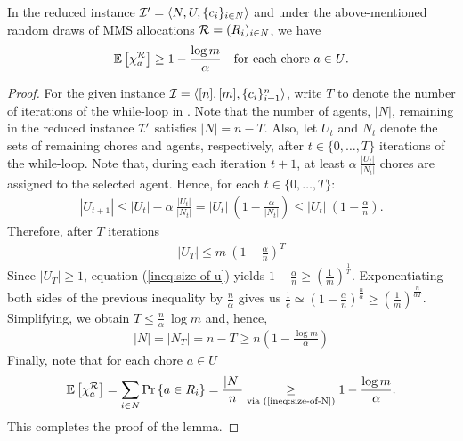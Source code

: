 \begin{lemma}\label{lem:rem-agents}
    In the reduced instance $\mathcal{I}'=\langle N,U,\{c_i\}_{i\in N}\rangle$ and under the above-mentioned random draws of MMS allocations $\mathcal{R}=(R_i)_{i\in N}$, we have  
    \begin{align*}
        \mathbb{E}\left[\chi^{\mathcal{R}}_a\right]\geq 1-\frac{\log m}{\alpha} \quad \text{for each chore $a\in U$.}
    \end{align*}
\end{lemma}
\begin{proof}
    For the given instance $\mathcal{I} = \langle [n], [m], \{c_i\}_{i=1}^n \rangle$, write $T$ to denote the number of iterations of the while-loop in . Note that the number of agents, $|N|$, remaining in the reduced instance $\mathcal{I}'$ satisfies $|N| = n - T$. Also, let $U_t$ and $N_t$ denote the sets of remaining chores and agents, respectively, after $t \in \{0,\dots,T\}$ iterations of the while-loop. Note that, during each iteration $t+1$, at least $\alpha\ \frac{|U_t|}{|N_t|}$ chores are assigned to the selected agent. Hence, for each $t\in\{0,\dots,T\}$: 
    \begin{align*}
    |U_{t+1}| \leq|U_t|-\alpha\ \frac{|U_t|}{|N_t|}=|U_t|\ \left(1-\frac{\alpha}{|N_t|}\right) 
     \leq|U_t|\ \left(1-\frac{\alpha}{n}\right).
    \end{align*} 
    Therefore, after $T$ iterations 
    \begin{align}|U_T| \leq m \  \left( 1 - \frac{\alpha}{n} \right)^T \label{ineq:size-of-u} 
    \end{align}
    Since $|U_T|\geq 1$, equation (\ref{ineq:size-of-u}) yields $1-\frac{\alpha}{n}\geq \left(\frac{1}{m}\right)^\frac{1}{T}$. Exponentiating both sides of the previous inequality by  $\frac{n}{\alpha}$ gives us $\frac{1}{e}\simeq (1 - \frac{\alpha}{n})^{\frac{n}{\alpha}} \geq \left(\frac{1}{m}\right)^\frac{n}{\alpha T}$. Simplifying, we obtain $T\leq  \frac{n}{\alpha} \ \log m$ and, hence, 
    \begin{align}
        |N| = |N_T| = n- T \geq n  \left(1-\frac{\log m}{\alpha}\right) \label{ineq:size-of-N}
    \end{align}
    Finally, note that for each chore $a\in U$ 
    \begin{align*}
        \mathbb{E}\left[\chi^{\mathcal{R}}_a\right]= \sum_{i\in N} \Pr \left\{a\in R_i\right\} = \frac{|N|}{n} \underset{ \text{via (\ref{ineq:size-of-N})}}{\geq} 1-\frac{\log m}{\alpha}.
    \end{align*}
This completes the proof of the lemma. 
\end{proof}

